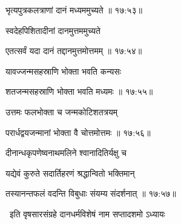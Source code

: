 
{\devanagarifont भृत्यपुत्रकलत्राणां दानं मध्यममुच्यते {॥ १७:५३॥} \veg\dontdisplaylinenum }%

{\devanagarifont स्वदेहपिशितादीनां दानमुत्तममुच्यते \thinspace{\dandab} \dontdisplaylinenum }%


{\devanagarifont एतत्सर्वं यदा दानं तद्दानमुत्तमोत्तमम् {॥ १७:५४॥} \veg\dontdisplaylinenum }%

{\devanagarifont यावज्जन्मसहस्राणि भोक्ता भवति कन्यसः \thinspace{\dandab} \dontdisplaylinenum }%
 

{\devanagarifont शतजन्मसहस्राणि भोक्ता भवति मध्यमः {॥ १७:५५॥} \veg\dontdisplaylinenum }%
 
{\devanagarifont उत्तमः फलभोक्ता च जन्मकोटिशतत्रयम् \thinspace{\dandab} \dontdisplaylinenum  }%


{\devanagarifont परार्धद्वयजन्मानां भोक्ता वै चोत्तमोत्तमः {॥ १७:५६॥} \veg\dontdisplaylinenum }%
 
\ujvers{}    %


\nemslokab

{\devanagarifont दीनान्धकृपणेष्वनाथमलिने श्वानादितिर्यक्षु च  \danda\dontdisplaylinenum }%

\nemslokac

{\devanagarifont यद्येवं कुरुते सदार्तिहरणं श्रद्धान्वितो भक्तिमान् }%
  \dontdisplaylinenum


\nemslokad

{\devanagarifont तस्यानन्तफलं वदन्ति विबुधाः संयम्य संदर्शनात् {॥ १७:५७॥} \veg\dontdisplaylinenum }%
 
\vers


{\devanagarifont 
\jump
\begin{center}
\ketdanda~इति वृषसारसंग्रहे दानधर्मविशेषं नाम सप्तादशमो ऽध्यायः~\ketdanda
\end{center}
\dontdisplaylinenum\vers  }%
 \bekveg\szamveg
\vfill
\phpspagebreak

